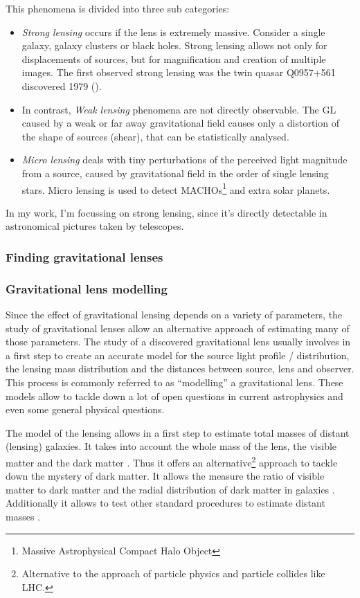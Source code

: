 \documentclass[11pt]{article}
\begin{document}
This phenomena is divided into three sub categories:
\begin{itemize}
	\item \emph{Strong lensing} occurs if the lens is extremely massive. Consider a single galaxy, galaxy clusters or black holes.
Strong lensing allows not only for displacements of sources, but for magnification and creation of multiple images.
The first observed strong lensing was the twin quasar Q0957+561 discovered 1979 (\cite{walsh19790957}).
  \item In contrast, \emph{Weak lensing} phenomena are not directly observable.
The GL caused by a weak or far away gravitational field causes only a distortion of the shape of sources (shear), that can be statistically analysed.
  \item \emph{Micro lensing} deals with tiny perturbations of the perceived light magnitude from a source, caused by gravitational field in the order of single lensing stars.
Micro lensing is used to detect MACHOs\footnote{Massive Astrophysical Compact Halo Object} and extra solar planets.
\end{itemize}

In my work, I'm focussing on strong lensing, since it's directly detectable in astronomical pictures taken by telescopes.


\subsubsection{Finding gravitational lenses}



\subsubsection{Gravitational lens modelling}

Since the effect of gravitational lensing depends on a variety of parameters, the study of gravitational lenses allow an alternative approach of estimating many of those parameters.
The study of a discovered gravitational lens usually involves in a first step to create an accurate model for the source light profile / distribution, the lensing mass distribution and the distances between source, lens and observer.
This process is commonly referred to as ``modelling'' a gravitational lens.
These models allow to tackle down a lot of open questions in current astrophysics and even some general physical questions.

The model of the lensing allows in a first step to estimate total masses of distant (lensing) galaxies.
It takes into account the whole mass of the lens, the visible matter and the dark matter \cite{kochanek1995there}.
Thus it offers an alternative\footnote{Alternative to the approach of particle physics and particle collides like LHC.} approach to tackle down the mystery of dark matter.
It allows the measure the ratio of visible matter to dark matter and the radial distribution of dark matter in galaxies \cite{treukoop04}.
Additionally it allows to test other standard procedures to estimate distant masses \cite{kochanek1995there}.
\end{document}
